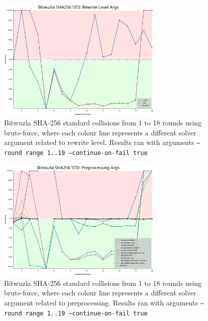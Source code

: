 \documentclass[a4paper]{report}
\begin{document}
\begin{figure}[H]
	\centering
	\includegraphics[width=0.7\textwidth]{../../graphs/bitwuzla_rewrite_level_args.svg}
	\caption{Bitwuzla SHA-256 standard collisions from 1 to 18 rounds using brute-force, where each colour line represents a different solver argument related to rewrite level.
	Results ran with arguments \texttt{--round range 1..19 --continue-on-fail true}}
	\label{fig:bitwuzla_rewrite}
\end{figure}

\begin{figure}[H]
	\centering
	\includegraphics[width=0.7\textwidth]{../../graphs/bitwuzla_preprocessing_args.svg}
	\caption{Bitwuzla SHA-256 standard collisions from 1 to 18 rounds using brute-force, where each colour line represents a different solver argument related to preprocessing.
	Results ran with arguments \texttt{--round range 1..19 --continue-on-fail true}}
	\label{fig:bitwuzla_preprocessing}
\end{figure}
\end{document}
